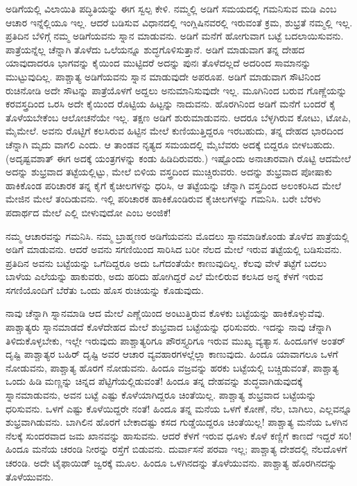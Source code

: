 ಅಡಿಗೆಯಲ್ಲಿ ವಿಲಾಯಿತಿ ಪದ್ಧಿತಿಯನ್ನು ಈಗ ಸ್ವಲ್ಪ ಕೇಳಿ. ನಮ್ಮಲ್ಲಿ ಅಡಿಗೆ ಸಮಯದಲ್ಲಿ ಗಮನಿಸುವ ಮಡಿ ಎಂಬ ಆಚಾರ ಇನ್ನೆಲ್ಲಿಯೂ ಇಲ್ಲ. ಆದರೆ ಬಡಿಸುವ ವಿಧಾನದಲ್ಲಿ ಇಂಗ್ಲಿಷಿನವರಲ್ಲಿ ಇರುವಂತೆ ಕ್ರಮ, ಶುಭ್ರತೆ ನಮ್ಮಲ್ಲಿ ಇಲ್ಲ. ಪ್ರತಿದಿನ ಬೆಳಿಗ್ಗೆ ನಮ್ಮ ಅಡಿಗೆಯವನು ಸ್ನಾನ ಮಾಡುವನು. ಅಡಿಗೆ ಮನೆಗೆ ಹೋಗುವಾಗ ಬಟ್ಟೆ ಬದಲಾಯಿಸುವನು. ಪಾತ್ರೆಯನ್ನೆಲ್ಲ ಚೆನ್ನಾಗಿ ತೊಳೆದು ಒಲೆಯನ್ನೂ ಶುದ್ಧಗೊಳಿಸುತ್ತಾನೆ. ಅಡಿಗೆ ಮಾಡುವಾಗ ತನ್ನ ದೇಹದ ಯಾವುದಾದರೂ ಭಾಗವನ್ನು ಕೈಯಿಂದ ಮುಟ್ಟಿದರೆ ಅದನ್ನು ಪುನಃ ತೊಳೆದಲ್ಲದೆ ಅದರಿಂದ ಸಾಮಾನನ್ನು ಮುಟ್ಟುವುದಿಲ್ಲ. ಪಾಶ್ಚಾತ್ಯ ಅಡಿಗೆಯವನು ಸ್ನಾನ ಮಾಡುವುದೇ ಅಪರೂಪ. ಅಡಿಗೆ ಮಾಡುವಾಗ ಸೌಟಿನಿಂದ ರುಚಿನೋಡಿ ಅದೇ ಸೌಟನ್ನು ಪಾತ್ರೆಯೊಳಗೆ ಅದ್ದಲು ಅನುಮಾನಿಸುವುದೇ ಇಲ್ಲ. ಮೂಗಿನಿಂದ ಬರುವ ಗೊಣ್ಣೆಯನ್ನು ಕರವಸ್ತ್ರದಿಂದ ಒರಸಿ ಅದೇ ಕೈಯಿಂದ ರೊಟ್ಟಿಯ ಹಿಟ್ಟನ್ನು ನಾದುವನು. ಹೊರಗಿನಿಂದ ಅಡಿಗೆ ಮನೆಗೆ ಬಂದರೆ ಕೈ ತೊಳೆಯಬೇಕೆಂಬ ಆಲೋಚನೆಯೇ ಇಲ್ಲ. ತಕ್ಷಣ ಅಡಿಗೆ ಶುರುಮಾಡುವನು. ಆದರೂ ಬೆಳ್ಳಗಿರುವ ಕೋಟು, ಟೋಪಿ, ಮೈಮೇಲೆ. ಅವನು ರೊಟ್ಟಿಗೆ ಕಲಸಿರುವ ಹಿಟ್ಟಿನ ಮೇಲೆ ಕುಣಿಯುತ್ತಿದ್ದರೂ ಇರಬಹುದು, ತನ್ನ ದೇಹದ ಭಾರದಿಂದ ಚೆನ್ನಾಗಿ ಮೃದು ವಾಗಲಿ ಎಂದು. ಆ ತಾಂಡವ ನೃತ್ಯದ ಸಮಯದಲ್ಲಿ ಮೈಬೆವರು ಅದಕ್ಕೆ ಬಿದ್ದರೂ ಬೀಳಬಹುದು.(ಅದೃಷ್ಟವಶಾತ್​ ಈಗ ಅದಕ್ಕೆ ಯಂತ್ರಗಳನ್ನು ಕಂಡು ಹಿಡಿದಿರುವರು.) ಇಷ್ಟೊಂದು ಅನಾಚಾರವಾಗಿ ರೊಟ್ಟಿ ಆದಮೇಲೆ ಅದನ್ನು ಶುಭ್ರವಾದ ತಟ್ಟೆಯಲ್ಲಿಟ್ಟು, ಮೇಲೆ ಬಿಳಿಯ ವಸ್ತ್ರದಿಂದ ಮುಚ್ಚಿರುವರು. ಅದನ್ನು ಶುಭ್ರವಾದ ಪೋಷಾಕು ಹಾಕಿಕೊಂಡ ಪರಿಚಾರಕ ತನ್ನ ಕೈಗೆ ಕೈಚೀಲಗಳನ್ನು ಧರಿಸಿ, ಆ ತಟ್ಟೆಯನ್ನು ಚೆನ್ನಾಗಿ ವಸ್ತ್ರದಿಂದ ಅಲಂಕರಿಸಿದ ಮೇಲೆ ಮೇಜಿನ ಮೇಲೆ ತಂದಿಡುವನು. ಇಲ್ಲಿ ಪರಿಚಾರಕ ಹಾಕಿಕೊಂಡಿರುವ ಕೈಚೀಲಗಳನ್ನು ಗಮನಿಸಿ. ಬರೇ ಬೆರಳು ಪದಾರ್ಥದ ಮೇಲೆ ಎಲ್ಲಿ ಬೀಳುವುದೋ ಎಂಬ ಅಂಜಿಕೆ!

ನಮ್ಮ ಆಚಾರವನ್ನು ಗಮನಿಸಿ. ನಮ್ಮ ಬ್ರಾಹ್ಮಣರ ಅಡಿಗೆಯವನು ಮೊದಲು ಸ್ನಾನಮಾಡಿಕೊಂಡು ತೊಳೆದ ಪಾತ್ರೆಯಲ್ಲಿ ಅಡಿಗೆ ಮಾಡುವನು. ಆದರೆ ಅವನು ಸಗಣಿಯಿಂದ ಸಾರಿಸಿದ ಬರೀ ನೆಲದ ಮೇಲೆ ಇರುವ ತಟ್ಟೆಯಲ್ಲಿ ಬಡಿಸುವನು. ಪ್ರತಿದಿನ ಅವನು ಬಟ್ಟೆಯನ್ನು ಒಗೆದಿದ್ದರೂ ಅದು ಒಗೆದಂತೆಯೇ ಕಾಣುವುದಿಲ್ಲ. ಕೆಲವು ವೇಳೆ ತಟ್ಟೆಗೆ ಬದಲು ಬಾಳೆಯ ಎಲೆಯನ್ನು ಹಾಕುವರು, ಅದು ಹರಿದು ಹೋಗಿದ್ದರೆ ಎಲೆ ಮೇಲಿರುವ ಕಲಸಿದ ಅನ್ನ ಕೆಳಗೆ ಇರುವ ಸಗಣಿಯೊಂದಿಗೆ ಬೆರೆತು ಒಂದು ಹೊಸ ರುಚಿಯನ್ನು ಕೊಡುವುದು.

ನಾವು ಚೆನ್ನಾಗಿ ಸ್ನಾನಮಾಡಿ ಆದ ಮೇಲೆ ಎಣ್ಣೆಯಿಂದ ಅಂಟುತ್ತಿರುವ ಕೊಳಕು ಬಟ್ಟೆಯನ್ನು ಹಾಕಿಕೊಳ್ಳುವೆವು. ಪಾಶ್ಚಾತ್ಯರು ಸ್ನಾನಮಾಡದೆ ಕೊಳೆದೇಹದ ಮೇಲೆ ಶುಭ್ರವಾದ ಬಟ್ಟೆಯನ್ನು ಧರಿಸುವರು. ಇದನ್ನು ನಾವು ಚೆನ್ನಾಗಿ ತಿಳಿದುಕೊಳ್ಳಬೇಕು, ಇಲ್ಲೇ ಇರುವುದು ಪಾಶ್ಚಾತ್ಯರಿಗೂ ಪೌರಸ್ತ್ಯರಿಗೂ ಇರುವ ಮುಖ್ಯ ವ್ಯತ್ಯಾಸ. ಹಿಂದೂಗಳ ಅಂತರ್​ ದೃಷ್ಟಿ ಪಾಶ್ಚಾತ್ಯರ ಬಹಿರ್​ ದೃಷ್ಟಿ ಅವರ ಆಚಾರ ವ್ಯವಹಾರಗಳಲ್ಲೆಲ್ಲಾ ಕಾಣುವುದು. ಹಿಂದೂ ಯಾವಾಗಲೂ ಒಳಗೆ ನೋಡುವನು, ಪಾಶ್ಚಾತ್ಯ ಹೊರಗೆ ನೋಡುವನು. ಹಿಂದೂ ವಜ್ರವನ್ನು ಹರಕು ಬಟ್ಟೆಯಲ್ಲಿ ಬಚ್ಚಿಡುವಂತೆ, ಪಾಶ್ಚಾತ್ಯ ಒಂದು ಹಿಡಿ ಮಣ್ಣನ್ನು ಚಿನ್ನದ ಪೆಟ್ಟಿಗೆಯಲ್ಲಿಡುವಂತೆ! ಹಿಂದೂ ತನ್ನ ದೇಹವನ್ನು ಶುದ್ಧವಾಗಿಡುವುದಕ್ಕೆ ಸ್ನಾನಮಾಡುವನು, ಅವನ ಬಟ್ಟೆ ಎಷ್ಟು ಕೊಳೆಯಾಗಿದ್ದರೂ ಚಿಂತೆಯಿಲ್ಲ. ಪಾಶ್ಚಾತ್ಯ ಶುಭ್ರವಾದ ಬಟ್ಟೆಯನ್ನು ಧರಿಸುವನು. ಒಳಗೆ ಎಷ್ಟು ಕೊಳೆಯಿದ್ದರೇ ನಂತೆ! ಹಿಂದೂ ತನ್ನ ಮನೆಯ ಒಳಗೆ ಕೋಣೆ, ನೆಲ, ಬಾಗಿಲು, ಎಲ್ಲವನ್ನೂ ಶುಭ್ರವಾಗಿಡುವನು. ಬಾಗಿಲಿನ ಹೊರಗೆ ಬೇಕಾದಷ್ಟು ಕಸದ ಗುಡ್ಡೆಯಿದ್ದರೂ ಚಿಂತೆಯಿಲ್ಲ! ಪಾಶ್ಚಾತ್ಯ ಮನೆಯ ಒಳಗಿನ ನೆಲಕ್ಕೆ ಸುಂದರವಾದ ಜಮ ಖಾನವನ್ನು ಹಾಸುವನು. ಆದರೆ ಕೆಳಗೆ ಇರುವ ಧೂಳು ಕೊಳೆ ಕಣ್ಣಿಗೆ ಕಾಣದೆ ಇದ್ದರೆ ಸರಿ! ಹಿಂದೂ ಮನೆಯ ಚರಂಡಿ ನೀರನ್ನು ರಸ್ತೆಗೆ ಬಿಡುವನು. ದುರ್ವಾಸನೆ ಪರವಾ ಇಲ್ಲ; ಪಾಶ್ಚಾತ್ಯ ದೇಶದಲ್ಲಿ ನೆಲದೊಳಗೆ ಚರಂಡಿ. ಅದೇ ಟೈಫಾಯಿಡ್​ ಜ್ವರಕ್ಕೆ ಮೂಲ. ಹಿಂದೂ ಒಳಗಿನದನ್ನು ತೊಳೆಯುವನು. ಪಾಶ್ಚಾತ್ಯ ಹೊರಗಿನದನ್ನು ತೊಳೆಯುವನು.

